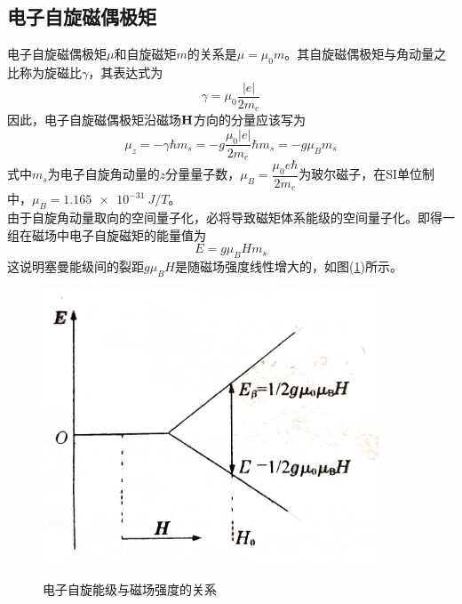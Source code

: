 \documentclass[a4paper]{article}
\begin{document}
\subsection{电子自旋磁偶极矩}
电子自旋磁偶极矩$ \mu $和自旋磁矩$ m $的关系是$\mu = \mu_0 m$。其自旋磁偶极矩与角动量之比称为旋磁比$\gamma$，其表达式为
\begin{equation}
\gamma = \mu_0\dfrac{|e|}{2m_e}       \label{eq1}
\end{equation}
因此，电子自旋磁偶极矩沿磁场$ \vb{H} $方向的分量应该写为
\begin{equation}
\mu_z = -\gamma\hbar m_s = -g\dfrac{\mu_0|e|}{2m_e}\hbar m_s = -g\mu_B m_s       \label{eq2}
\end{equation}
式中$ m_s $为电子自旋角动量的$ z $分量量子数，$\mu_B = \dfrac{\mu_0 e \hbar}{2m_e}$为玻尔磁子，在SI单位制中，$ \mu_B = \SI{1.165e-31}{J/T} $。\\
由于自旋角动量取向的空间量子化，必将导致磁矩体系能级的空间量子化。即得一组在磁场中电子自旋磁矩的能量值为
\begin{equation}
E = g\mu_B Hm_s      \label{eq3}
\end{equation}
这说明塞曼能级间的裂距$g\mu_BH$是随磁场强度线性增大的，如图(\ref{fig1})所示。
\begin{figure}[H]
\centering
\includegraphics[width=10cm]{fig/fig1.jpg}\\
\caption{电子自旋能级与磁场强度的关系}\label{fig1}    
\end{figure}
\end{document}
